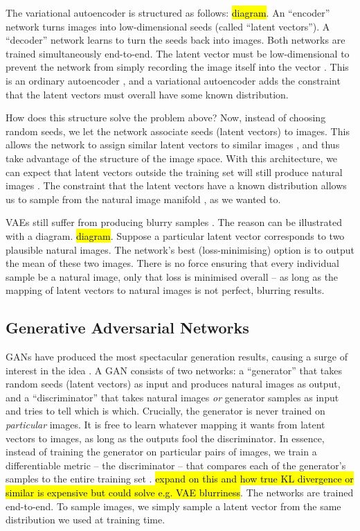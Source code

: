 \documentclass[10pt,a4paper]{article}
\newcommand{\nquote}[1]{``{#1}''}
\begin{document}
The variational autoencoder \cite{vae} is structured as follows: \hl{diagram}. An \nquote{encoder} network turns images into low-dimensional seeds (called \nquote{latent vectors}). A \nquote{decoder} network learns to turn the seeds back into images. Both networks are trained simultaneously end-to-end. The latent vector must be low-dimensional to prevent the network from simply recording the image itself into the vector \cite{??}. This is an ordinary autoencoder \cite{??}, and a variational autoencoder \cite{vae} adds the constraint that the latent vectors must overall have some known distribution.

How does this structure solve the problem above? Now, instead of choosing random seeds, we let the network associate seeds (latent vectors) to images. This allows the network to assign similar latent vectors to similar images \cite{??}, and thus take advantage of the structure of the image space. With this architecture, we can expect that latent vectors outside the training set will still produce natural images \cite{??}. The constraint that the latent vectors have a known distribution allows us to sample from the natural image manifold \cite{??}, as we wanted to.

VAEs still suffer from producing blurry samples \cite{??}. The reason can be illustrated with a diagram. \hl{diagram}. Suppose a particular latent vector corresponds to two plausible natural images. The network's best (loss-minimising) option is to output the mean of these two images. There is no force ensuring that every individual sample be a natural image, only that loss is minimised overall -- as long as the mapping of latent vectors to natural images is not perfect, blurring results.

\subsection{Generative Adversarial Networks}

GANs have produced the most spectacular generation results, causing a surge of interest in the idea \cite{??,??,??}. A GAN consists of two networks: a \nquote{generator} that takes random seeds (latent vectors) as input and produces natural images as output, and a \nquote{discriminator} that takes natural images \emph{or} generator samples as input and tries to tell which is which. Crucially, the generator is never trained on \emph{particular} images. It is free to learn whatever mapping it wants from latent vectors to images, as long as the outputs fool the discriminator. In essence, instead of training the generator on particular pairs of images, we train a differentiable metric -- the discriminator -- that compares each of the generator's samples to the entire training set \cite{??}. \hl{expand on this and how true KL divergence or similar is expensive but could solve e.g. VAE blurriness}. The networks are trained end-to-end. To sample images, we simply sample a latent vector from the same distribution we used at training time.
\end{document}
